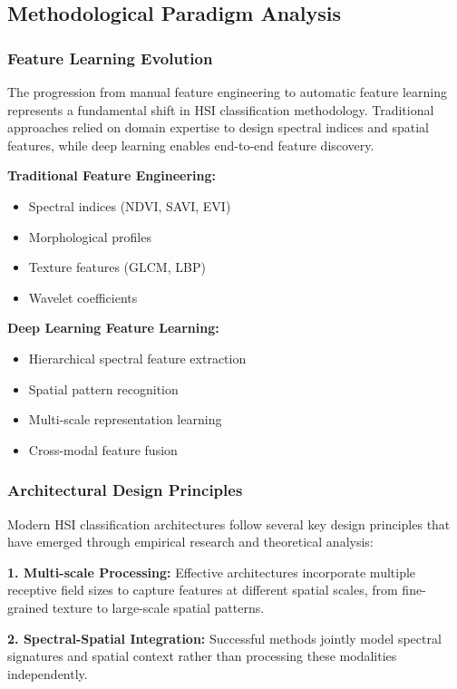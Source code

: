 \documentclass[journal]{IEEEtran}
\begin{document}
\subsection{Methodological Paradigm Analysis}

\subsubsection{Feature Learning Evolution}

The progression from manual feature engineering to automatic feature learning represents a fundamental shift in HSI classification methodology. Traditional approaches relied on domain expertise to design spectral indices and spatial features, while deep learning enables end-to-end feature discovery.

\textbf{Traditional Feature Engineering:}
\begin{itemize}
\item Spectral indices (NDVI, SAVI, EVI)
\item Morphological profiles
\item Texture features (GLCM, LBP)
\item Wavelet coefficients
\end{itemize}

\textbf{Deep Learning Feature Learning:}
\begin{itemize}
\item Hierarchical spectral feature extraction
\item Spatial pattern recognition
\item Multi-scale representation learning
\item Cross-modal feature fusion
\end{itemize}

\subsubsection{Architectural Design Principles}

Modern HSI classification architectures follow several key design principles that have emerged through empirical research and theoretical analysis:

\textbf{1. Multi-scale Processing:} Effective architectures incorporate multiple receptive field sizes to capture features at different spatial scales, from fine-grained texture to large-scale spatial patterns.

\textbf{2. Spectral-Spatial Integration:} Successful methods jointly model spectral signatures and spatial context rather than processing these modalities independently.
\end{document}
